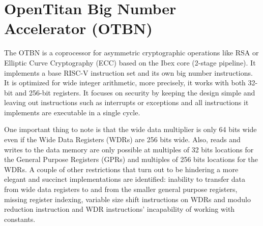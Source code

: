 \section{OpenTitan Big Number Accelerator (OTBN)}

The OTBN \parencite{OTBN} is a coprocessor for asymmetric cryptographic operations like RSA or Elliptic Curve Cryptography (ECC) based on the Ibex core (2-stage pipeline). It implements a base RISC-V instruction set and its own big number instructions. It is optimized for wide integer arithmetic, more precisely, it works with both 32-bit and 256-bit registers. It focuses on security by keeping the design simple and leaving out instructions such as interrupts or exceptions and all instructions it implements are executable in a single cycle. 

One important thing to note is that the wide data multiplier is only 64 bits wide even if the Wide Data Registers (WDRs) are 256 bits wide. Also, reads and writes to the data memory are only possible at multiples of 32 bits locations for the General Purpose Registers (GPRs) and multiples of 256 bits locations for the WDRs. A couple of other restrictions that turn out to be hindering a more elegant and succinct implementations are identified: inability to transfer data from wide data registers to and from the smaller general purpose registers, missing register indexing, variable size shift instructions on WDRs and modulo reduction instruction and WDR instructions' incapability of working with constants.